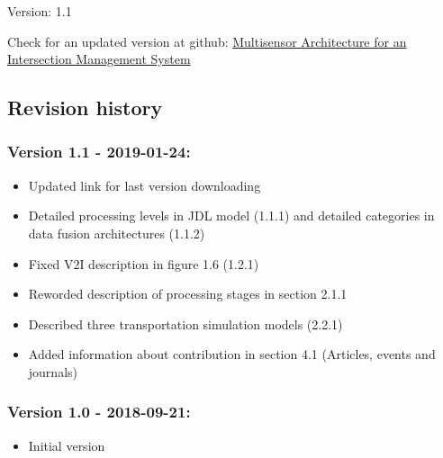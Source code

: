\begin{titlepage}
    \begin{center}
%   
%        
%		        
%        
%        
%        
%		
%        
{}
Version: 1.1 \\
\vspace{2cm}

      
\end{center}
    
Check for an updated version at github: 
\href{https://github.com/gustavovelascoh/msc-report/wiki}{Multisensor Architecture for an Intersection Management System}


\subsection*{Revision history}
\subsubsection*{Version 1.1 - 2019-01-24:}

	\begin{itemize}
	\item Updated link for last version downloading
	\item Detailed processing levels in JDL model (1.1.1) and detailed categories in data fusion architectures (1.1.2)
	\item Fixed V2I description in figure 1.6 (1.2.1)
	\item Reworded description of processing stages in section 2.1.1
	\item Described three transportation simulation models (2.2.1)
	\item Added information about contribution in section 4.1 (Articles, events and journals)
	\end{itemize}


\subsubsection*{Version 1.0 - 2018-09-21:}
	\begin{itemize}
	\item Initial version
	\end{itemize}


\end{titlepage}